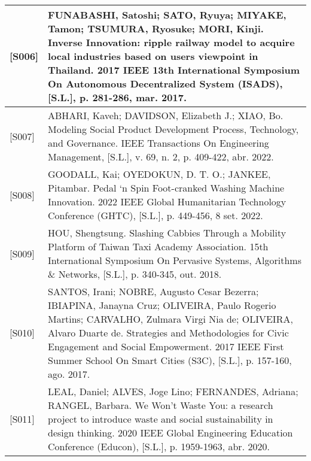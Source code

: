 \begin{table}[H]
\begin{tabularx}{\textwidth}{|l|Y|}
{[}S006{]} & FUNABASHI, Satoshi; SATO, Ryuya; MIYAKE, Tamon; TSUMURA, Ryosuke; MORI, Kinji. Inverse Innovation: ripple railway model to acquire local industries based on users viewpoint in Thailand. 2017 IEEE 13th International Symposium On Autonomous Decentralized System (ISADS), {[}S.L.{]}, p. 281-286, mar. 2017. \\ \hline

{[}S007{]} & ABHARI, Kaveh; DAVIDSON, Elizabeth J.; XIAO, Bo. Modeling Social Product Development Process, Technology, and Governance. IEEE Transactions On Engineering Management, {[}S.L.{]}, v. 69, n. 2, p. 409-422, abr. 2022. \\ \hline

{[}S008{]} & GOODALL, Kai; OYEDOKUN, D. T. O.; JANKEE, Pitambar. Pedal ‘n Spin Foot-cranked Washing Machine Innovation. 2022 IEEE Global Humanitarian Technology Conference (GHTC), {[}S.L.{]}, p. 449-456, 8 set. 2022. \\ \hline

{[}S009{]} & HOU, Shengtsung. Slashing Cabbies Through a Mobility Platform of Taiwan Taxi Academy Association. 15th International Symposium On Pervasive Systems, Algorithms \& Networks, {[}S.L.{]}, p. 340-345, out. 2018. \\ \hline

{[}S010{]} & SANTOS, Irani; NOBRE, Augusto Cesar Bezerra; IBIAPINA, Janayna Cruz; OLIVEIRA, Paulo Rogerio Martins; CARVALHO, Zulmara Virgi Nia de; OLIVEIRA, Alvaro Duarte de. Strategies and Methodologies for Civic Engagement and Social Empowerment. 2017 IEEE First Summer School On Smart Cities (S3C), {[}S.L.{]}, p. 157-160, ago. 2017. \\ \hline

{[}S011{]} & LEAL, Daniel; ALVES, Joge Lino; FERNANDES, Adriana; RANGEL, Barbara. We Won’t Waste You: a research project to introduce waste and social sustainability in design thinking. 2020 IEEE Global Engineering Education Conference (Educon), {[}S.L.{]}, p. 1959-1963, abr. 2020. \\ \hline

\end{tabularx}
\vspace{0.5em}
\label{tab:artigos}
\end{table}
